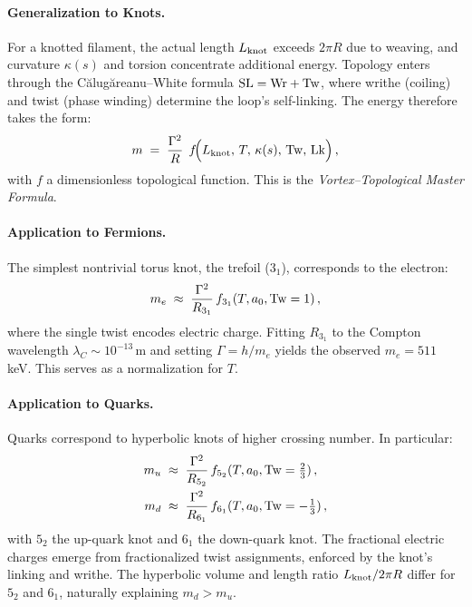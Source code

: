 \documentclass[12pt]{article}
\begin{document}
\paragraph{Generalization to Knots.}
For a knotted filament, the actual length $L_{\rm knot}$ exceeds $2\pi R$ due to weaving, and curvature $\kappa(s)$ and torsion concentrate additional energy. Topology enters through the Călugăreanu–White formula ${\rm SL}={\rm Wr}+{\rm Tw}$, where writhe (coiling) and twist (phase winding) determine the loop’s self-linking. The energy therefore takes the form:
\begin{equation}
m \;=\; \frac{\Gamma^2}{R}\;\,f\!\Big(L_{\rm knot},\,T,\,\kappa(s),\,{\rm Tw},\,{\rm Lk}\Big)\,,
\label{eq:master}
\end{equation}
with $f$ a dimensionless topological function. This is the \emph{Vortex–Topological Master Formula}.

\paragraph{Application to Fermions.}
The simplest nontrivial torus knot, the trefoil ($3_1$), corresponds to the electron:
\begin{equation}
m_e \;\approx\; \frac{\Gamma^2}{R_{3_1}}\,f_{3_1}(T,a_0,{\rm Tw}=1)\,,
\end{equation}
where the single twist encodes electric charge. Fitting $R_{3_1}$ to the Compton wavelength $\lambda_C\sim 10^{-13}\,$m and setting $\Gamma = h/m_e$ yields the observed $m_e=511$ keV. This serves as a normalization for $T$.

\paragraph{Application to Quarks.}
Quarks correspond to hyperbolic knots of higher crossing number. In particular:
\begin{align}
m_u &\;\approx\; \frac{\Gamma^2}{R_{5_2}}\,f_{5_2}(T,a_0,{\rm Tw}=\tfrac{2}{3})\,, \\
m_d &\;\approx\; \frac{\Gamma^2}{R_{6_1}}\,f_{6_1}(T,a_0,{\rm Tw}=-\tfrac{1}{3})\,,
\end{align}
with $5_2$ the up-quark knot and $6_1$ the down-quark knot. The fractional electric charges emerge from fractionalized twist assignments, enforced by the knot’s linking and writhe. The hyperbolic volume and length ratio $L_{\rm knot}/2\pi R$ differ for $5_2$ and $6_1$, naturally explaining $m_d > m_u$.
\end{document}
